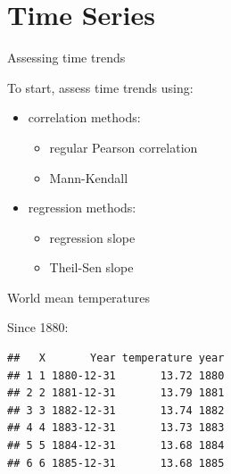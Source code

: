 \section{Time Series}
\frame{\sectionpage}

\begin{frame}[fragile]{Assessing time trends}
  
  To start, assess time trends using:
  
  \begin{itemize}
  \item correlation methods:
    \begin{itemize}
    \item regular Pearson correlation
    \item Mann-Kendall
    \end{itemize}
    

  \item regression methods:
    \begin{itemize}
    \item regression slope
    \item Theil-Sen slope
    \end{itemize}
  \end{itemize}
  
\end{frame}

\begin{frame}[fragile]{World mean temperatures}
  
  Since 1880:
  
\begin{knitrout}
\color{fgcolor}\begin{kframe}
\begin{alltt}
\hlkwb{=}\hlstd{(}\hlstd{)}
\end{alltt}
\begin{verbatim}
##   X       Year temperature year
## 1 1 1880-12-31       13.72 1880
## 2 2 1881-12-31       13.79 1881
## 3 3 1882-12-31       13.74 1882
## 4 4 1883-12-31       13.73 1883
## 5 5 1884-12-31       13.68 1884
## 6 6 1885-12-31       13.68 1885
\end{verbatim}
\begin{alltt}
\end{alltt}
\end{kframe}
\end{knitrout}

\begin{knitrout}
\color{fgcolor}\begin{kframe}
\begin{alltt}
\hlopt{~}\hlstd{=}\hlstd{)}
\hlstd{(}\hlopt{~}
\end{alltt}
\end{kframe}
\end{knitrout}

\end{frame}

